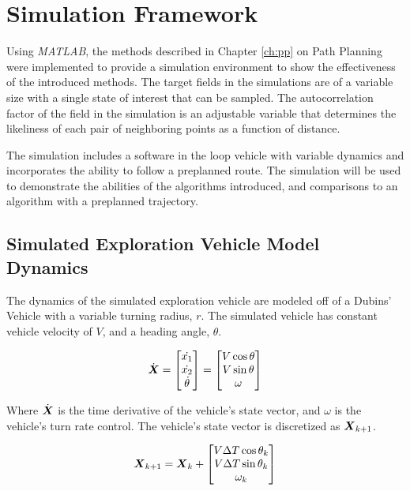 \chapter{Simulation Framework}
Using \textit{MATLAB}, the methods described in Chapter \ref{ch:pp} on Path Planning were implemented to provide a simulation environment to show the effectiveness of the introduced methods. The target fields in the simulations are of a variable size with a single state of interest that can be sampled. The autocorrelation factor of the field in the simulation is an adjustable variable that determines the likeliness of each pair of neighboring points as a function of distance. 

The simulation includes a software in the loop vehicle with variable dynamics and incorporates the ability to follow a preplanned route. The simulation will be used to demonstrate the abilities of the algorithms introduced, and comparisons to an algorithm with a preplanned trajectory. 

\section{Simulated Exploration Vehicle Model Dynamics}
The dynamics of the simulated exploration vehicle are modeled off of a Dubins' Vehicle with a variable turning radius, $r$. The simulated vehicle has constant vehicle velocity of $V$, and a heading angle, $\theta$.

\begin{equation}
\dot{{\it{\boldsymbol{X}}}} =
	\begin{bmatrix}
		\dot{x_1} \\
		\dot{x_2} \\
		\dot{\theta} \\
	\end{bmatrix} = 
	\begin{bmatrix}
		V \cos \theta \\
		V \sin \theta \\
		\omega
	\end{bmatrix}
\end{equation}

Where $\dot{{\it{\boldsymbol{X}}}}$ is the time derivative of the vehicle's state vector, and $\omega$ is the vehicle's turn rate control. The vehicle's state vector is discretized as ${\it{\boldsymbol{X}}}_{k+1}$.

\begin{equation}
{\it{\boldsymbol{X}}}_{k+1} = {\it{\boldsymbol{X}}}_k +
	\begin{bmatrix}
		V \Delta T \cos \theta_k \\
		V \Delta T \sin \theta_k \\
		\omega_k
	\end{bmatrix}
\end{equation}

